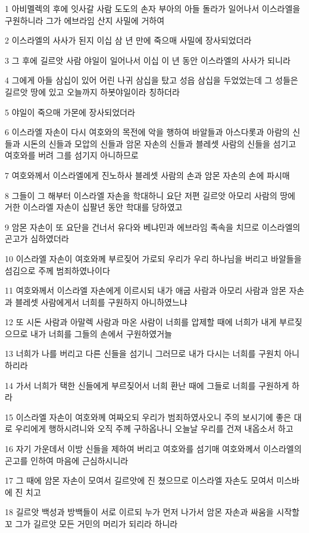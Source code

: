\par 1 아비멜렉의 후에 잇사갈 사람 도도의 손자 부아의 아들 돌라가 일어나서 이스라엘을 구원하니라 그가 에브라임 산지 사밀에 거하여
\par 2 이스라엘의 사사가 된지 이십 삼 년 만에 죽으매 사밀에 장사되었더라
\par 3 그 후에 길르앗 사람 야일이 일어나서 이십 이 년 동안 이스라엘의 사사가 되니라
\par 4 그에게 아들 삼십이 있어 어린 나귀 삼십을 탔고 성읍 삼십을 두었었는데 그 성들은 길르앗 땅에 있고 오늘까지 하봇야일이라 칭하더라
\par 5 야일이 죽으매 가몬에 장사되었더라
\par 6 이스라엘 자손이 다시 여호와의 목전에 악을 행하여 바알들과 아스다롯과 아람의 신들과 시돈의 신들과 모압의 신들과 암몬 자손의 신들과 블레셋 사람의 신들을 섬기고 여호와를 버려 그를 섬기지 아니하므로
\par 7 여호와께서 이스라엘에게 진노하사 블레셋 사람의 손과 암몬 자손의 손에 파시매
\par 8 그들이 그 해부터 이스라엘 자손을 학대하니 요단 저편 길르앗 아모리 사람의 땅에 거한 이스라엘 자손이 십팔년 동안 학대를 당하였고
\par 9 암몬 자손이 또 요단을 건너서 유다와 베냐민과 에브라임 족속을 치므로 이스라엘의 곤고가 심하였더라
\par 10 이스라엘 자손이 여호와께 부르짖어 가로되 우리가 우리 하나님을 버리고 바알들을 섬김으로 주께 범죄하였나이다
\par 11 여호와께서 이스라엘 자손에게 이르시되 내가 애굽 사람과 아모리 사람과 암몬 자손과 블레셋 사람에게서 너희를 구원하지 아니하였느냐
\par 12 또 시돈 사람과 아말렉 사람과 마온 사람이 너희를 압제할 때에 너희가 내게 부르짖으므로 내가 너희를 그들의 손에서 구원하였거늘
\par 13 너희가 나를 버리고 다른 신들을 섬기니 그러므로 내가 다시는 너희를 구원치 아니하리라
\par 14 가서 너희가 택한 신들에게 부르짖어서 너희 환난 때에 그들로 너희를 구원하게 하라
\par 15 이스라엘 자손이 여호와께 여짜오되 우리가 범죄하였사오니 주의 보시기에 좋은 대로 우리에게 행하시려니와 오직 주께 구하옵나니 오늘날 우리를 건져 내옵소서 하고
\par 16 자기 가운데서 이방 신들을 제하여 버리고 여호와를 섬기매 여호와께서 이스라엘의 곤고를 인하여 마음에 근심하시니라
\par 17 그 때에 암몬 자손이 모여서 길르앗에 진 쳤으므로 이스라엘 자손도 모여서 미스바에 진 치고
\par 18 길르앗 백성과 방백들이 서로 이르되 누가 먼저 나가서 암몬 자손과 싸움을 시작할꼬 그가 길르앗 모든 거민의 머리가 되리라 하니라

